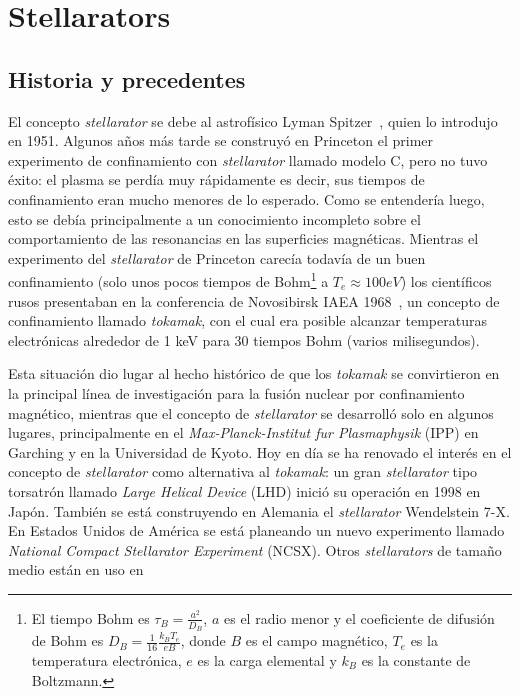 \chapter{Stellarators}\label{ch:cap2}
\section{Historia y precedentes}
El concepto \textit{stellarator} se debe al astrofísico Lyman Spitzer~\cite{doi:10.1063/1.1705883}, quien lo
introdujo en 1951. Algunos años más tarde se construyó en Princeton el primer experimento de confinamiento con \textit{stellarator} llamado modelo C, pero
no tuvo éxito: el plasma se perdía muy rápidamente es decir, sus tiempos
de confinamiento eran mucho menores de lo esperado. Como se entendería
luego, esto se debía principalmente a un conocimiento incompleto sobre el
comportamiento de las resonancias en las superficies magnéticas. Mientras
el experimento del \textit{stellarator} de Princeton carecía todavía de un buen confinamiento (solo unos pocos tiempos de Bohm\footnote{El tiempo Bohm es $\tau_B=\frac{a^2}{D_B}$, $a$ es el radio menor y el coeficiente de difusión de Bohm es $D_B=\frac{1}{16}\frac{k_BT_e}{eB}$, donde $B$ es el campo magnético, $T_e$ es la temperatura electrónica, $e$ es la carga elemental y $k_B$ es la constante de Boltzmann.}
a $T_e\approx100 eV$) los científicos
rusos presentaban en la conferencia de Novosibirsk IAEA 1968~\cite{Artsimovich1969}, un concepto de confinamiento llamado \textit{tokamak}, con el cual era posible alcanzar
temperaturas electrónicas alrededor de 1 keV para 30 tiempos Bohm (varios
milisegundos).\par
Esta situación dio lugar al hecho histórico de que los \textit{tokamak} se convirtieron en la principal línea de investigación para la fusión nuclear por
confinamiento magnético, mientras que el concepto de \textit{stellarator} se desarrolló solo en algunos lugares, principalmente en el \textit{Max-Planck-Institut fur
Plasmaphysik} (IPP) en Garching y en la Universidad de Kyoto. Hoy en día
se ha renovado el interés en el concepto de \textit{stellarator} como alternativa al
\textit{tokamak}: un gran \textit{stellarator} tipo torsatrón llamado \textit{Large Helical Device}
(LHD) inició su operación en 1998 en Japón. También se está construyendo
en Alemania el \textit{stellarator} Wendelstein 7-X. En Estados Unidos de América
se está planeando un nuevo experimento llamado \textit{National Compact Stellarator Experiment} (NCSX). Otros \textit{stellarators} de tamaño medio están en uso en
